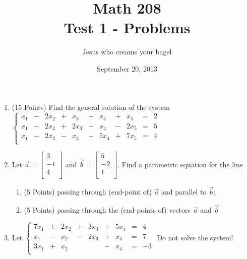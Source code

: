 \documentclass[12pt]{article}
\title{Math 208\\Test 1 - Problems}
\date{September 20, 2013}
\author{Jesus who creams your bagel}
\begin{document}
\maketitle
\begin{enumerate}
	\item (15 Points) Find the general solution of the system \\
		$\left\{\begin{array}{rrrrrrrrrrr}
	   	 	x_1 & - & 2x_2 & + & x_3 & + & x_4 & + & x_5 & = & 2\\
	   	 	x_1 & - & 2x_2 & + & 2x_3 & - & x_4 & - & 2x_5 & = & 5\\
	   		 x_1 & - & 2x_2 & - & x_3 & + & 5x_4 & + & 7x_5 & = & 4\\
		\end{array}\right.$ \\
	\item Let $\vec{a} =
	 	\left[ \begin{array}{r}
			3\\
			-1\\
			4\\
		\end{array}\right]$
		and $\vec{b} = 
		\left[\begin{array}{r}
			5\\
			-2\\
			1\\
		\end{array}\right]$. Find a parametric equation for the line\\
	\begin{enumerate}
		\item (5 Points) passing through (end-point of) $\vec{a}$ and parallel to $\vec{b}$;\\
		\item (5 Points) passing through the (end-points of) vectors $\vec{a}$ and $\vec{b}$\\
	\end{enumerate}
	\item Let $\left\{\begin{array}{rrrrrrrrr}
			7x_1&+&2x_2&+&3x_3&+&5x_4&=&4\\
			x_1&-&x_2&-&2x_3&+&x_4&=&7\\
			3x_1&+&x_2&&  &-&x_4&=&-3\\
		\end{array}\right.$
	\textbf{}{Do not solve the system!}\\
	\begin{enumerate}

\end{enumerate}
\end{enumerate}
\end{document}
